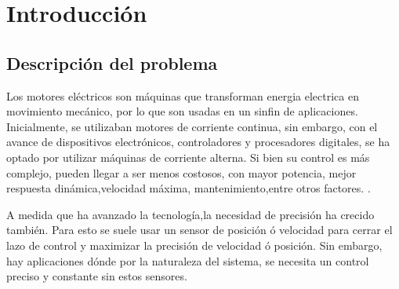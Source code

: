 
\chapter{Introducción}


\section{Descripción del problema}

%


Los motores eléctricos son máquinas que transforman energia electrica en movimiento mecánico, por lo que son usadas en un sinfin de aplicaciones. Inicialmente, se utilizaban motores de corriente continua, sin embargo, con el avance de dispositivos electrónicos, controladores y procesadores digitales, se ha optado por utilizar máquinas de corriente alterna. Si bien su control es más complejo, pueden llegar a ser menos costosos, con mayor potencia, mejor respuesta dinámica,velocidad máxima, mantenimiento,entre otros factores. \cite{vierbergenPredictingImprovingBehaviour} \cite{deangeloControlParaMaquinas2004}.

A medida que ha avanzado la tecnología,la necesidad de precisión ha crecido también.
Para esto  se suele usar un sensor de posición ó velocidad para cerrar el lazo de control y maximizar la precisión de velocidad ó posición. Sin embargo, hay aplicaciones dónde por la naturaleza del sistema, se necesita un control preciso y constante sin estos sensores. 



%

